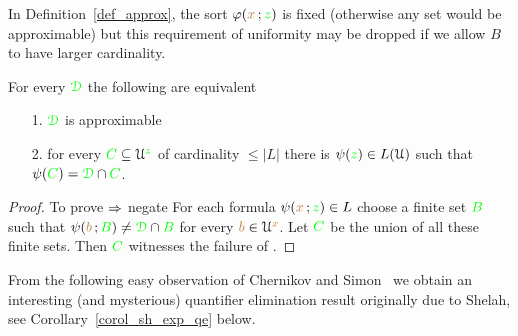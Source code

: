 In Definition~\ref{def_approx}, the sort $\varphi({\color{brown} x}\,;{\color{green} z})$ is fixed (otherwise any set would be approximable) but this requirement of uniformity may be dropped if we allow $B$ to have larger cardinality.

\begin{proposition}\label{lem_approx_nonunif}
For every ${\color{green}\EuScript D}$ the following are equivalent
\begin{itemize}
\item[1.] ${\color{green}\EuScript D}$ is approximable
\item[2.] for every ${\color{green} C}\subseteq\EuScript U^{\color{green} z}$ of cardinality $\le|L|$ there is $\psi({\color{green} z})\in L(\EuScript U)$ such that $\psi({\color{green} C})={\color{green}\EuScript D}\cap{\color{green}C}$.
\end{itemize}
\end{proposition}

\begin{proof}
To prove $\Rightarrow$ negate 
For each formula $\psi({\color{brown} x}\,;{\color{green} z})\in L$ choose a finite set ${\color{green} B}$ such that $\psi({\color{brown} b}\,;{\color{green} B})\neq{\color{green}\EuScript D}\cap{\color{green}B}$ for every ${\color{brown} b}\in\EuScript U^{\color{brown} x}$.
Let ${\color{green} C}$ be the union of all these finite sets.
Then ${\color{green} C}$ witnesses the failure of .
\end{proof}




From the following easy observation of Chernikov and Simon~\cite{CS} we obtain an interesting (and mysterious) quantifier elimination result originally due to Shelah, see Corollary~\ref{corol_sh_exp_qe} below.

